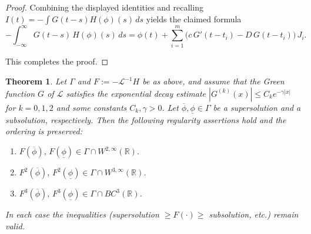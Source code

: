 \documentclass[12pt,letterpaper]{amsart}
\newtheorem{theorem}{Theorem}[section]
\theoremstyle{definition}
\theoremstyle{remark}
\numberwithin{equation}{section}
\begin{document}
\begin{proof}
 	Combining the displayed identities and recalling $I(t)=-\int G(t-s)H(\phi)(s)\,ds$
 	yields the claimed formula
 	\[
 	-\int_{-\infty}^{\infty} G(t-s)\,H(\phi)(s)\,ds
 	= \phi(t) + \sum_{i=1}^{m}\bigl(c\,G'(t-t_i)-D\,G(t-t_i)\bigr)\,J_i.
 	\]
 	
 	This completes the proof.
 \end{proof}
 
 
   
 \begin{theorem}\label{smooth1}
 	Let $\Gamma$ and $F:=-\mathcal L^{-1}H$ be as above, and assume that the Green
 	function $G$ of $\mathcal L$ satisfies the exponential decay estimate
 	$|G^{(k)}(x)|\le C_k e^{-\gamma|x|}$ for $k=0,1,2$ and some constants $C_k,\gamma>0$.
 	Let $\overline\phi,\underline\phi\in\Gamma$ be a supersolution and a subsolution,
 	respectively. Then the following regularity assertions hold and the ordering is preserved:
 	\begin{enumerate}
 		\item $F(\overline\phi),\,F(\underline\phi)\in \Gamma\cap W^{2,\infty}(\mathbb R)$.
 		\item $F^2(\overline\phi),\,F^2(\underline\phi)\in \Gamma\cap W^{3,\infty}(\mathbb R)$.
 		\item $F^3(\overline\phi),\,F^3(\underline\phi)\in \Gamma\cap BC^3(\mathbb R)$.
 	\end{enumerate}
 	In each case the inequalities (supersolution $\ge F(\cdot)\ge$ subsolution, etc.)
 	remain valid.
 \end{theorem}
\end{document}
